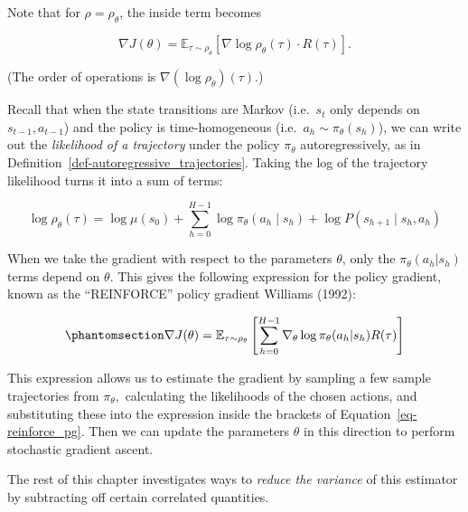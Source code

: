 \documentclass[
  letterpaper,
  DIV=11,
  numbers=noendperiod]{scrreprt}
\theoremstyle{plain}
\theoremstyle{plain}
\theoremstyle{definition}
\theoremstyle{definition}
\theoremstyle{remark}
\begin{document}
Note that for \(\rho = \rho_\theta\), the inside term becomes

\[
\nabla J(\theta) = \mathbb{E}_{\tau \sim \rho_\theta} [ \nabla \log \rho_\theta(\tau) \cdot R(\tau)].
\]

(The order of operations is \(\nabla (\log \rho_\theta)(\tau)\).)

Recall that when the state transitions are Markov (i.e.~\(s_{t}\) only
depends on \(s_{t-1}, a_{t-1}\)) and the policy is time-homogeneous
(i.e.~\(a_h\sim \pi_\theta (s_h)\)), we can write out the
\emph{likelihood of a trajectory} under the policy \(\pi_\theta\)
autoregressively, as in
Definition~\ref{def-autoregressive_trajectories}. Taking the log of the
trajectory likelihood turns it into a sum of terms:

\[
\log \rho_\theta(\tau) = \log \mu(s_0) + \sum_{h=0}^{H-1} \log \pi_\theta(a_h\mid s_h) + \log P(s_{h+1} \mid s_h, a_h)
\]

When we take the gradient with respect to the parameters \(\theta\),
only the \(\pi_\theta(a_h| s_h)\) terms depend on \(\theta\). This gives
the following expression for the policy gradient, known as the
``REINFORCE'' policy gradient Williams (1992):

\begin{equation}\phantomsection\label{eq-reinforce_pg}{
\begin{aligned}
    \nabla J(\theta) = \mathbb{E}_{\tau \sim \rho_\theta} \left[ \sum_{h=0}^{H-1} \nabla_\theta \log \pi_{\theta}(a_h| s_h) R(\tau) \right]
\end{aligned}
}\end{equation}

This expression allows us to estimate the gradient by sampling a few
sample trajectories from \(\pi_\theta,\) calculating the likelihoods of
the chosen actions, and substituting these into the expression inside
the brackets of Equation~\ref{eq-reinforce_pg}. Then we can update the
parameters \(\theta\) in this direction to perform stochastic gradient
ascent.

The rest of this chapter investigates ways to \emph{reduce the variance}
of this estimator by subtracting off certain correlated quantities.
\end{document}
